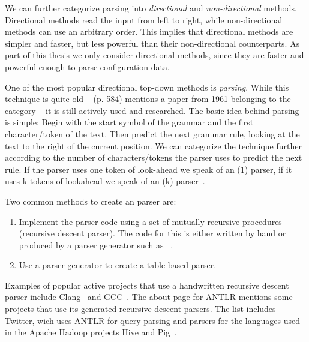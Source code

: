 We can further categorize parsing into \emph{directional} and \emph{non-directional} methods. Directional methods read the input from left to right, while non-directional methods can use an arbitrary order. This implies that directional methods are simpler and faster, but less powerful than their non-directional counterparts. As part of this thesis we only consider directional methods, since they are faster and powerful enough to parse configuration data.

One of the most popular directional top-down methods is \emph{ parsing}. While this technique is quite old –  (p. 584) mentions a paper from 1961 belonging to the  category – it is still actively used and researched. The basic idea behind  parsing is simple: Begin with the start symbol of the grammar and the first character/\gls{token} of the text. Then predict the next grammar rule, looking at the text to the right of the current position. We can categorize the technique further according to the number of characters/\glspl{token} the parser uses to predict the next rule. If the parser uses one \gls{token} of look-ahead we speak of an (1) parser, if it uses k \glspl{token} of lookahead we speak of an (k) parser~\cite{rosenkrantz1969properties}.

Two common methods to create an  parser are:

\begin{enumerate}

  \item Implement the parser code using a set of mutually recursive procedures (recursive descent parser). The code for this is either written by hand or produced by a parser generator such as ~\cite{parr2013recursive}.

  \item Use a parser generator to create a table-based parser.

\end{enumerate}

Examples of popular active projects that use a handwritten recursive descent parser include \href{http://clang.llvm.org}{Clang}~\cite{bendersky2012clang} and \href{http://gcc.gnu.org}{GCC}~\cite{myers2008cparser}. The \href{http://www.antlr.org/about.html}{about page} for \gls{ANTLR} mentions some projects that use its generated recursive descent parsers. The list includes Twitter, wich uses ANTLR for query parsing and parsers for the languages used in the Apache Hadoop projects Hive and Pig~\cite{parr2013definitive}.


